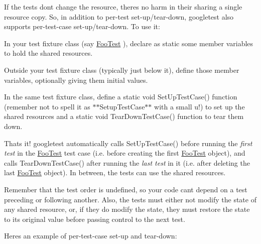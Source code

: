 If the tests don\textquotesingle{}t change the resource, there\textquotesingle{}s no harm in their sharing a single resource copy. So, in addition to per-\/test set-\/up/tear-\/down, googletest also supports per-\/test-\/case set-\/up/tear-\/down. To use it\+:


\begin{DoxyEnumerate}
\item In your test fixture class (say {\ttfamily \mbox{\hyperlink{class_foo_test}{Foo\+Test}}} ), declare as {\ttfamily static} some member variables to hold the shared resources.
\end{DoxyEnumerate}
\begin{DoxyEnumerate}
\item Outside your test fixture class (typically just below it), define those member variables, optionally giving them initial values.
\end{DoxyEnumerate}
\begin{DoxyEnumerate}
\item In the same test fixture class, define a {\ttfamily static void Set\+Up\+Test\+Case()} function (remember not to spell it as $\ast$$\ast${\ttfamily Setup\+Test\+Case}$\ast$$\ast$ with a small {\ttfamily u}!) to set up the shared resources and a {\ttfamily static void Tear\+Down\+Test\+Case()} function to tear them down.
\end{DoxyEnumerate}

That\textquotesingle{}s it! googletest automatically calls {\ttfamily Set\+Up\+Test\+Case()} before running the {\itshape first test} in the {\ttfamily \mbox{\hyperlink{class_foo_test}{Foo\+Test}}} test case (i.\+e. before creating the first {\ttfamily \mbox{\hyperlink{class_foo_test}{Foo\+Test}}} object), and calls {\ttfamily Tear\+Down\+Test\+Case()} after running the {\itshape last test} in it (i.\+e. after deleting the last {\ttfamily \mbox{\hyperlink{class_foo_test}{Foo\+Test}}} object). In between, the tests can use the shared resources.

Remember that the test order is undefined, so your code can\textquotesingle{}t depend on a test preceding or following another. Also, the tests must either not modify the state of any shared resource, or, if they do modify the state, they must restore the state to its original value before passing control to the next test.

Here\textquotesingle{}s an example of per-\/test-\/case set-\/up and tear-\/down\+:


